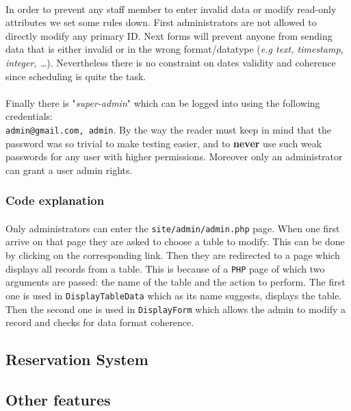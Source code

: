 \documentclass[11pt,a4paper,titlepage]{article}
\begin{document}
\paragraph{}
In order to prevent any staff member to enter invalid data or modify read-only attributes we set some rules down. First administrators are not allowed to directly modify any primary ID. Next forms will prevent anyone from sending data that is either invalid or in the wrong format/datatype (\textit{e.g text, timestamp, integer, \ldots}). Nevertheless there is no constraint on dates validity and coherence since scheduling is quite the task.
\paragraph{}
Finally there is "\textit{super-admin}" which can be logged into using the following credentials:\\\verb|admin@gmail.com, admin|. By the way the reader must keep in mind that the password was so trivial to make testing easier, and to \textbf{never} use such weak passwords for any user with higher permissions. Moreover only an administrator can grant a user admin rights. 

\subsubsection{Code explanation}
\paragraph{}
Only administrators can enter the \verb|site/admin/admin.php| page. When one first arrive on that page they are asked to choose a table to modify. This can be done by clicking on the corresponding link. Then they are redirected to a page which displays all records from a table. This is because of a \verb|PHP| page of which two arguments are passed: the name of the table and the action to perform. The first one is used in \verb|DisplayTableData| which as its name suggests, displays the table. Then the second one is used in \verb|DisplayForm| which allows the admin to modify a record and checks for data format coherence.

\subsection{Reservation System}

\subsection{Other features}
\end{document}
